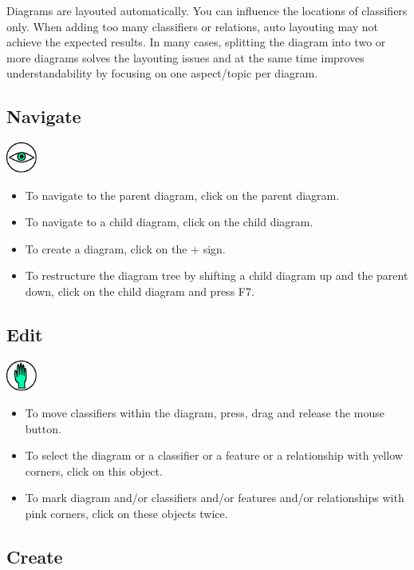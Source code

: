 Diagrams are layouted automatically. You can influence the locations of classifiers only.
When adding too many classifiers or relations, auto layouting may not achieve the expected results.
In many cases, splitting the diagram into two or more diagrams solves the layouting issues and
at the same time improves understandability by focusing on one aspect/topic per diagram.

\subsection{Navigate}

\includegraphics[width=1cm]{../../gui/source/resources/tool_navigate.pdf}
\begin{itemize}
\item To navigate to the parent diagram, click on the parent diagram.
\item To navigate to a child diagram, click on the child diagram.
\item To create a diagram, click on the + sign.
\item To restructure the diagram tree by shifting a child diagram up and the parent down, click on the child diagram and press F7.
\end{itemize}

\subsection{Edit}

\includegraphics[width=1cm]{../../gui/source/resources/tool_edit.pdf}
\begin{itemize}
\item To move classifiers within the diagram, press, drag and release the mouse button.
\item To select the diagram or a classifier or a feature or a relationship with yellow corners, click on this object.
\item To mark diagram and/or classifiers and/or features and/or relationships with pink corners, click on these objects twice.
\end{itemize}

\subsection{Create}

